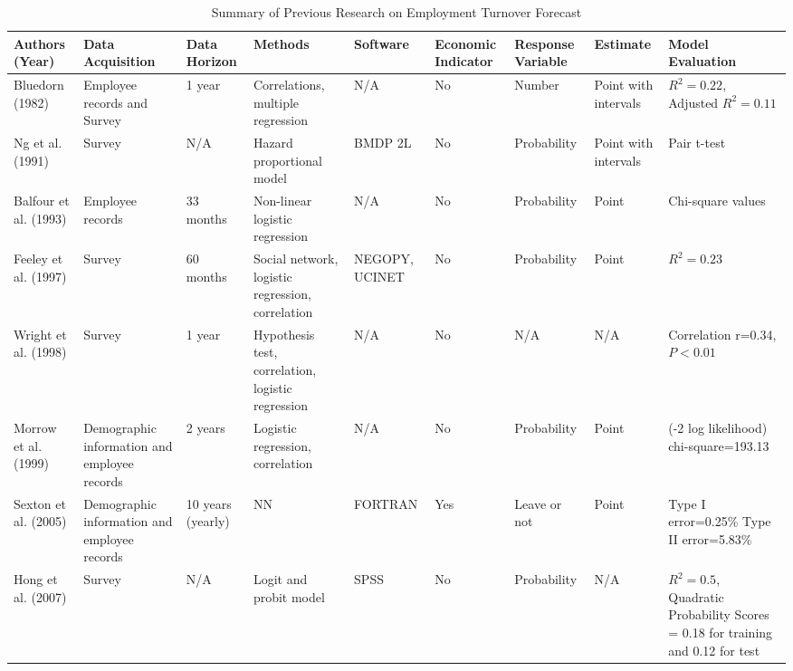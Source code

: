 \begin{landscape}%
\pagestyle{empty}%
	\begin{table}[htbp]
		\centering
		\scriptsize
		\caption{Summary of Previous Research on Employment Turnover Forecast}
		\begin{tabular}{L{2.8cm}  L{2.8cm}  C{1.2cm}  L{3cm} C{1.2cm}  C{1.5cm} C{1.5cm} C{1.5cm}  L{2.8cm}}
			\toprule
			Authors (Year) & Data Acquisition &  Data Horizon & Methods & Software & Economic Indicator & Response Variable & Estimate & Model Evaluation \\
			\midrule
			Bluedorn (1982)& Employee records and Survey & 1 year & Correlations, multiple regression & N/A & No & Number & Point with intervals& $R^2=0.22$, Adjusted $R^2=0.11$ \\
			
			Ng et al. (1991) & Survey & N/A   & Hazard proportional model & BMDP 2L & No    &  Probability  & Point with intervals & Pair t-test  \\
			
			Balfour et al. (1993) & Employee records  & 33 months & Non-linear logistic regression & N/A   & No    & Probability  & Point & Chi-square values  \\
			
			Feeley et al. (1997) & Survey & 60 months & Social network, logistic regression, correlation & NEGOPY, UCINET & No    & Probability  & Point & $R^2=0.23$ \\
			
			Wright et al. (1998) & Survey & 1 year & Hypothesis test, correlation, logistic regression  & N/A   & No    & N/A   & N/A   & Correlation r=0.34, $P<0.01$ \\
			
			Morrow et al. (1999) & Demographic information and employee records & 2 years & Logistic regression, correlation & N/A   & No    & Probability  & Point & (-2 log likelihood) chi-square=193.13 \\
			
			Sexton et al. (2005) & Demographic information and employee records & 10 years (yearly) & NN    & FORTRAN  & Yes   & Leave or not & Point & Type I error=0.25\% Type II error=5.83\% \\
			
			Hong et al. (2007) & Survey & N/A   & Logit and probit model & SPSS  & No    & Probability  & N/A   & $R^2=0.5$, Quadratic Probability Scores = 0.18 for training and 0.12 for test \\
			

\end{tabular}
\end{table}
\end{landscape}
